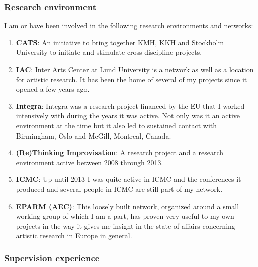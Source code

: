 

\subsubsection*{\textsf{Research environment}}

I am or have been involved in the following research environments and networks:

\begin{enumerate}
\item \textbf{CATS}: An initiative to bring together KMH, KKH and Stockholm University to initiate and stimulate cross discipline projects. 
\item \textbf{IAC}: Inter Arts Center at Lund University is a network as well as a location for artistic research. It has been the home of several of my projects since it opened a few years ago.
\item \textbf{Integra}: Integra was a research project financed by the EU that I worked intensively with during the years it was active. Not only was it an active environment at the time but it also led to sustained contact with Birmingham, Oslo and McGill, Montreal, Canada.
\item \textbf{(Re)Thinking Improvisation}: A research project and a research environment active between 2008 through 2013.
\item \textbf{ICMC}: Up until 2013 I was quite active in ICMC and the conferences it produced and several people in ICMC are still part of my network.
\item \textbf{EPARM (AEC)}: This loosely built network, organized around a small working group of which I am a part, has proven very useful to my own projects in the way it gives me insight in the state of affairs concerning artistic research in Europe in general.
\end{enumerate}

\subsubsection*{\textsf{Supervision experience}}

